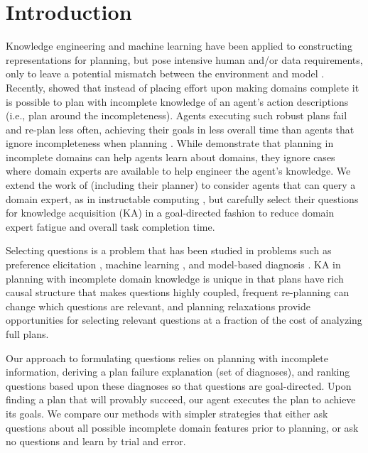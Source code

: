 \documentclass{article}
\begin{document}
\section{Introduction}

Knowledge engineering \citep{ickeps09} and machine learning
\citep{arms,DBLP:conf/aaai/OatesC96} have been applied to constructing
representations for planning, but pose intensive human and/or data requirements,
only to leave a potential mismatch between the environment and model
\citep{modellite}.  Recently, \citet{bryce-icaps11} showed that instead of
placing effort upon making domains complete it is possible to plan with
incomplete knowledge of an agent's action descriptions (i.e., plan around the
incompleteness).  Agents executing such robust plans fail and re-plan less often,
achieving their goals in less overall time than agents that ignore
incompleteness when planning \citep{DBLP:conf/aips/ChangA06}.  While
\citet{bryce-icaps11} demonstrate that planning in incomplete domains can
help agents learn about domains, they ignore cases where domain experts are
available to help engineer the agent's knowledge.  We extend the work of
\citet{bryce-icaps11} (including their  planner) to consider agents
that can query a domain expert, as in instructable computing \citep{mable}, but carefully select their questions for
knowledge acquisition (KA) in a goal-directed fashion to reduce domain expert
fatigue and overall task completion time.

Selecting questions is a problem that has been studied in problems such as
preference elicitation \citep{DBLP:conf/aaai/Boutilier02}, machine learning
\citep{AICPub1812:2011}, and model-based diagnosis
\citep{deKleer:1992:CDS:140524.140531}.  KA in planning with
incomplete domain knowledge is unique in that plans have rich causal structure
that makes questions highly coupled, frequent re-planning can change which
questions are relevant, and planning relaxations provide opportunities for
selecting relevant questions at a fraction of the cost of analyzing full plans.  

Our approach to formulating questions relies on planning with incomplete
information, deriving a plan failure explanation (set of diagnoses), and ranking
questions based upon these diagnoses so that questions are goal-directed.  Upon
finding a plan that will provably succeed, our agent executes the plan to
achieve its goals.  We compare our methods with simpler strategies that either
ask questions about all possible incomplete domain features prior to planning, or ask no questions and
learn by trial and error.
\end{document}

